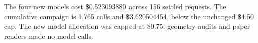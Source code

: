 The four new models cost \$0.523093880 across 156 settled requests.
The cumulative campaign is 1,765 calls and \$3.620504454, below the unchanged \$4.50 cap.
The new model allocation was capped at \$0.75; geometry audits and paper renders made no model calls.
